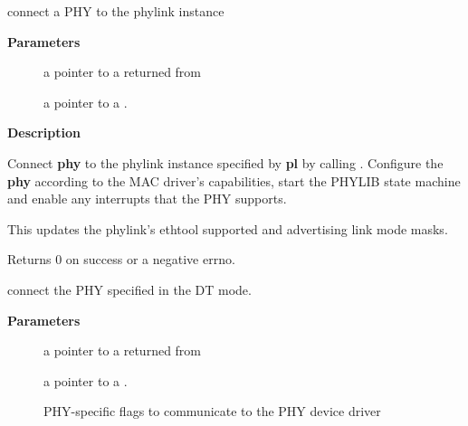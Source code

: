 \documentclass[a4paper,8pt,english]{sphinxmanual}
\begin{document}
\begin{fulllineitems}
\label{networking/kapi:c.phylink_connect_phy}
connect a PHY to the phylink instance

\end{fulllineitems}


\textbf{Parameters}
\begin{description}
\item[{}] \leavevmode
a pointer to a {\hyperref[networking/kapi:c.phylink]{\emph{}}} returned from {\hyperref[networking/kapi:c.phylink_create]{\emph{}}}

\item[{}] \leavevmode
a pointer to a .

\end{description}

\textbf{Description}

Connect \textbf{phy} to the phylink instance specified by \textbf{pl} by calling
{\hyperref[networking/kapi:c.phy_attach_direct]{\emph{}}}. Configure the \textbf{phy} according to the MAC driver's
capabilities, start the PHYLIB state machine and enable any interrupts
that the PHY supports.

This updates the phylink's ethtool supported and advertising link mode
masks.

Returns 0 on success or a negative errno.

\begin{fulllineitems}
\label{networking/kapi:c.phylink_of_phy_connect}
connect the PHY specified in the DT mode.

\end{fulllineitems}


\textbf{Parameters}
\begin{description}
\item[{}] \leavevmode
a pointer to a {\hyperref[networking/kapi:c.phylink]{\emph{}}} returned from {\hyperref[networking/kapi:c.phylink_create]{\emph{}}}

\item[{}] \leavevmode
a pointer to a .

\item[{}] \leavevmode
PHY-specific flags to communicate to the PHY device driver

\end{description}
\end{document}
